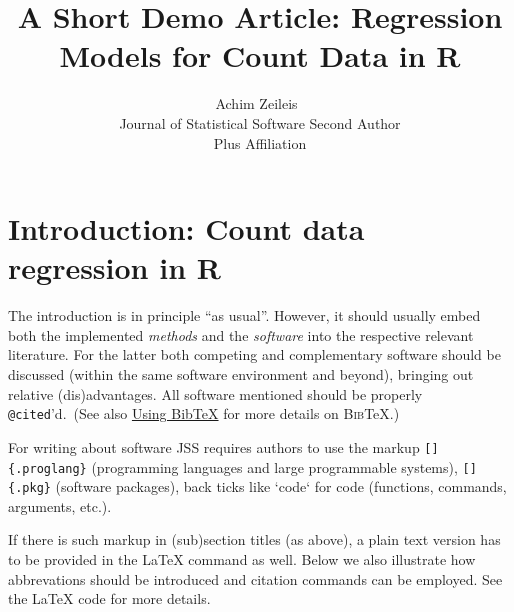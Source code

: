 \documentclass[
  article]{jss}
\author{Achim Zeileis~\orcidlink{0000-0003-0918-3766}\\Journal of
Statistical Software \And Second Author\\Plus Affiliation}
\title{A Short Demo Article: Regression Models for Count Data in R}
\begin{document}
\maketitle
\ifdefined\Shaded\renewenvironment{Shaded}{\begin{tcolorbox}[interior hidden, borderline west={3pt}{0pt}{shadecolor}, frame hidden, boxrule=0pt, sharp corners, enhanced, breakable]}{\end{tcolorbox}}\fi

\hypertarget{sec-intro}{%
\section{Introduction: Count data regression in R}\label{sec-intro}}

\begin{tcolorbox}[enhanced jigsaw, bottomrule=.15mm, colback=white, left=2mm, breakable, toprule=.15mm, opacityback=0, arc=.35mm, colframe=quarto-callout-color-frame, rightrule=.15mm, leftrule=.75mm]

The introduction is in principle ``as usual''. However, it should
usually embed both the implemented \emph{methods} and the
\emph{software} into the respective relevant literature. For the latter
both competing and complementary software should be discussed (within
the same software environment and beyond), bringing out relative
(dis)advantages. All software mentioned should be properly
\texttt{@cited}'d.~(See also \protect\hyperlink{sec-bibtex}{Using
BibTeX} for more details on \textsc{Bib}{\TeX}.)

For writing about software JSS requires authors to use the markup
\texttt{{[}{]}\{.proglang\}} (programming languages and large
programmable systems), \texttt{{[}{]}\{.pkg\}} (software packages), back
ticks like `code` for code (functions, commands, arguments, etc.).

If there is such markup in (sub)section titles (as above), a plain text
version has to be provided in the {\LaTeX} command as well. Below we
also illustrate how abbrevations should be introduced and citation
commands can be employed. See the {\LaTeX} code for more details.

\end{tcolorbox}
\end{document}

